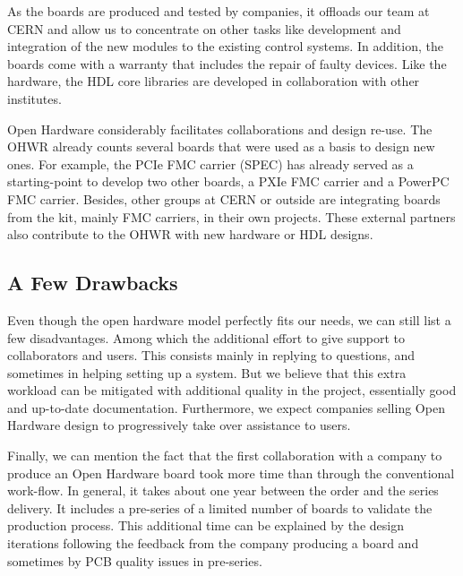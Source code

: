 \documentclass{JAC2003}
\begin{document}
As the boards are produced and tested by companies, it offloads our team at CERN and allow us to concentrate on other tasks like development and integration of the new modules to the existing control systems.
In addition, the boards come with a warranty that includes the repair of faulty devices.
Like the hardware, the HDL core libraries are developed in collaboration with other institutes.

Open Hardware considerably facilitates collaborations and design re-use.
The OHWR already counts several boards that were used as a basis to design new ones.
For example, the PCIe FMC carrier (SPEC) has already served as a starting-point to develop two other boards, a PXIe FMC carrier and a PowerPC FMC carrier.
Besides, other groups at CERN or outside are integrating boards from the kit, mainly FMC carriers, in their own projects.
These external partners also contribute to the OHWR with new hardware or HDL designs.




\subsection{A Few Drawbacks}
Even though the open hardware model perfectly fits our needs, we can still list a few disadvantages.
Among which the additional effort to give support to collaborators and users.
This consists mainly in replying to questions, and sometimes in helping setting up a system.
But we believe that this extra workload can be mitigated with additional quality in the project, essentially good and up-to-date documentation.
Furthermore, we expect companies selling Open Hardware design to progressively take over assistance to users.

Finally, we can mention the fact that the first collaboration with a company to produce an Open Hardware board took more time than through the conventional work-flow.
In general, it takes about one year between the order and the series delivery.
It includes a pre-series of a limited number of boards to validate the production process.
This additional time can be explained by the design iterations following the feedback from the company producing a board and sometimes by PCB quality issues in pre-series.
\end{document}
